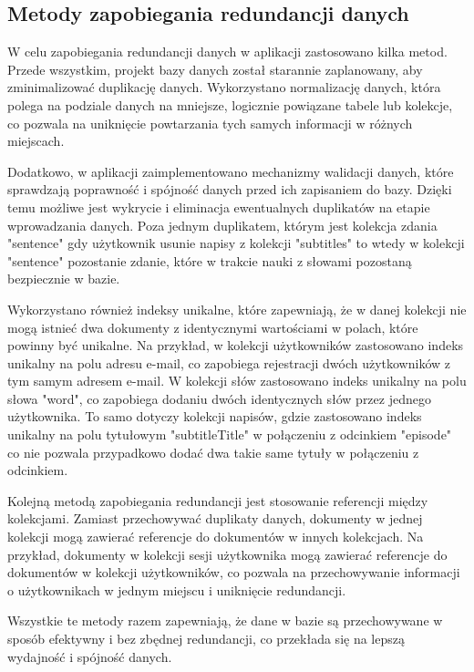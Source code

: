 \subsection{Metody zapobiegania redundancji danych}
W celu zapobiegania redundancji danych w aplikacji zastosowano kilka metod. Przede wszystkim, projekt bazy danych został starannie zaplanowany, aby zminimalizować duplikację danych. Wykorzystano normalizację danych, która polega na podziale danych na mniejsze, logicznie powiązane tabele lub kolekcje, co pozwala na uniknięcie powtarzania tych samych informacji w różnych miejscach.

Dodatkowo, w aplikacji zaimplementowano mechanizmy walidacji danych, które sprawdzają poprawność i spójność danych przed ich zapisaniem do bazy. Dzięki temu możliwe jest wykrycie i eliminacja ewentualnych duplikatów na etapie wprowadzania danych. Poza jednym duplikatem, którym jest kolekcja zdania "sentence" gdy użytkownik usunie napisy z kolekcji "subtitles" to wtedy w kolekcji "sentence" pozostanie zdanie, które w trakcie nauki z słowami pozostaną bezpiecznie w bazie.

Wykorzystano również indeksy unikalne, które zapewniają, że w danej kolekcji nie mogą istnieć dwa dokumenty z identycznymi wartościami w polach, które powinny być unikalne. Na przykład, w kolekcji użytkowników zastosowano indeks unikalny na polu adresu e-mail, co zapobiega rejestracji dwóch użytkowników z tym samym adresem e-mail. W kolekcji słów zastosowano indeks unikalny na polu słowa "word", co zapobiega dodaniu dwóch  identycznych słów przez jednego użytkownika. To samo dotyczy kolekcji napisów, gdzie zastosowano indeks unikalny na polu tytułowym "subtitleTitle" w połączeniu z odcinkiem "episode" co nie pozwala przypadkowo dodać dwa takie same tytuły w połączeniu z odcinkiem.

Kolejną metodą zapobiegania redundancji jest stosowanie referencji między kolekcjami. Zamiast przechowywać duplikaty danych, dokumenty w jednej kolekcji mogą zawierać referencje do dokumentów w innych kolekcjach. Na przykład, dokumenty w kolekcji sesji użytkownika mogą zawierać referencje do dokumentów w kolekcji użytkowników, co pozwala na przechowywanie informacji o użytkownikach w jednym miejscu i uniknięcie redundancji.

Wszystkie te metody razem zapewniają, że dane w bazie są przechowywane w sposób efektywny i bez zbędnej redundancji, co przekłada się na lepszą wydajność i spójność danych.




